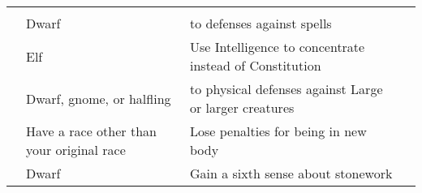 {\begin{longtabu}{>{\lcol}p{10em} >{\lcol}p{15em} >{\lcol}X >{\lcol}p{3em}}
    \midrule
     &  &  &  \\
     & Dwarf &  to defenses against spells &  \\
     & Elf & Use Intelligence to concentrate instead of Constitution &  \\
     & Dwarf, gnome, or halfling &  to physical defenses against Large or larger creatures &  \\
     & Have a race other than your original race & Lose penalties for being in new body &  \\
     & Dwarf & Gain a sixth sense about stonework &  \\


\end{longtabu}}
